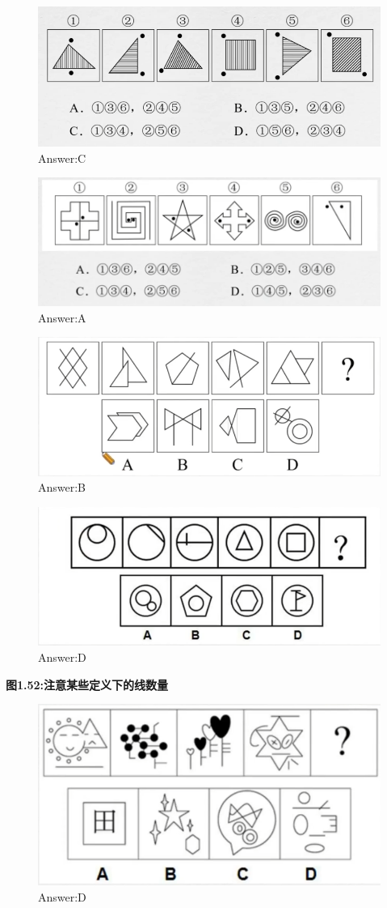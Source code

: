 \documentclass{article}
\numberwithin{equation}{section}						%
\numberwithin{figure}{section}							%
\begin{document}
\begin{sloppypar}
\begin{figure}[H]
     \centering
     \includegraphics[width=0.6\linewidth]{52.png}
		\caption{Answer:C}
\end{figure}



\begin{figure}[H]
     \centering
     \includegraphics[width=0.6\linewidth]{53.png}
		\caption{Answer:A}
\end{figure}


\begin{figure}[H]
     \centering
     \includegraphics[width=0.6\linewidth]{54.png}
		\caption{Answer:B}
\end{figure}


\begin{figure}[H]
     \centering
     \includegraphics[width=0.6\linewidth]{55.png}
		\caption{Answer:D}
\end{figure}

\textbf{图1.52:注意某些定义下的线数量}


\begin{figure}[H]
     \centering
     \includegraphics[width=0.6\linewidth]{56.png}
		\caption{Answer:D}
\end{figure}


\end{sloppypar}
\end{document}
